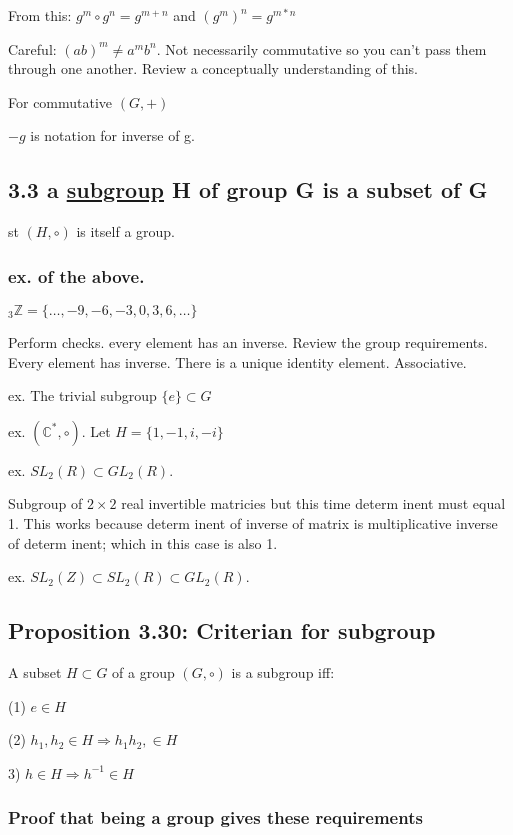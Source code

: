\documentclass[class=scrartcl, crop=false]{standalone}
\begin{document}
From this: $g^m \circ g^n = g^{m + n}$ and  $(g^m)^n = g^{m * n}$

Careful:  $(ab)^m \neq a^m b^n$. Not necessarily commutative so you can't pass them through one another. Review a conceptually understanding of this.

For commutative  $(G, +)$

 $-g$ is notation for inverse of g.

\subsection{3.3 a \underline{subgroup} H of group G is a subset of G}

st $(H, \circ)$ is itself a group.

\subsubsection{ex. of the above.}

$_3\mathbb{Z} = \{\dots, -9, -6, -3, 0, 3, 6, \dots\}$

Perform checks. every element has an inverse. Review the group requirements. Every element has inverse. There is a unique identity element. Associative. 


ex. The trivial subgroup  $\{e\} \subset G$


ex.  $(\mathbb{C}^*, \circ)$. Let  $H = \{1, -1, i, -i\}$

ex.  $SL_2(R) \subset GL_2(R)$.

Subgroup of $2\times 2$ real invertible matricies but this time determ inent must equal 1.  This works because determ inent of inverse of matrix is multiplicative inverse of determ inent; which in this case is also 1.


ex.  $SL_2(Z) \subset SL_2(R) \subset GL_2(R)$.

\subsection{Proposition 3.30: Criterian for subgroup}

A subset $H \subset G$ of a group $(G, \circ)$ is a subgroup iff: 

(1) $e \in H$ 

(2) $h_1, h_2 \in H \Rightarrow h_1h_2, \in H$

3)  $h \in H \Rightarrow h^{-1} \in H$ 

\subsubsection{Proof that being a group gives these requirements}
\end{document}
